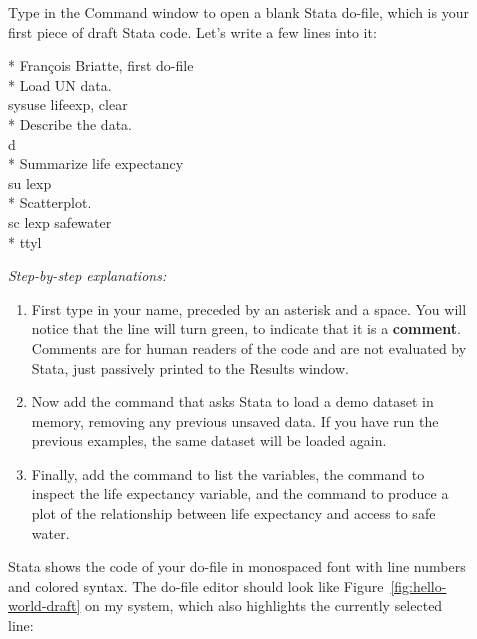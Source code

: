 	\begin{description}
	\item[] Type  in the Command window to open a blank Stata do-file, which is your first piece of draft Stata code. Let's write a few lines into it:%

		\begin{docspec}
		  * François Briatte, first do-file\\[1em]%
		  * Load UN data.\\%
			sysuse lifeexp, clear\\[1em]%
			* Describe the data.\\%
			d\\[1em]%
			* Summarize life expectancy\\%
			su lexp\\[1em]%
			* Scatterplot.\\%
		  sc lexp safewater\\[1em]%
			* ttyl\\
		\end{docspec}

		\emph{Step-by-step explanations:}
		
		\begin{enumerate}
			\item First type in your name, preceded by an asterisk and a space. You will notice that the line will turn green, to indicate that it is a \textbf{comment}. Comments are for human readers of the code and are not evaluated by Stata, just passively printed to the Results window.%
			
			\item Now add the  command that asks Stata to load a demo dataset in memory, removing any previous unsaved data. If you have run the previous examples, the same dataset will be loaded again.%
			
			\item Finally, add the  command to list the variables, the  command to inspect the life expectancy variable, and the  command to produce a plot of the relationship between life expectancy and access to safe water.%

		\end{enumerate}

		Stata shows the code of your do-file in monospaced font with line numbers and colored syntax. The do-file editor should look like Figure~\ref{fig:hello-world-draft} on my system, which also highlights the currently selected line:%


\end{description}
